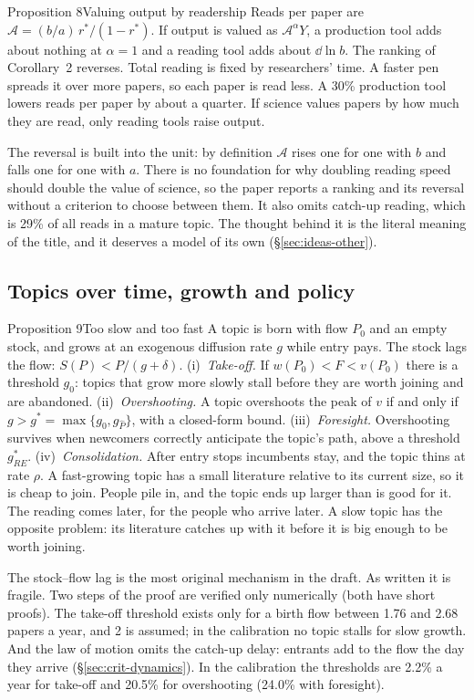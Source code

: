 \begin{resultbox}{Proposition 8}{Valuing output by readership}{\tminor}
Reads per paper are $\mathcal A=(b/a)\,r^*/(1-r^*)$. If output is valued as $\mathcal A^{\alpha}Y$, a production tool adds about nothing at $\alpha=1$ and a reading tool adds about $\dd\ln b$. The ranking of Corollary~2 reverses.
\tcblower
\inwords Total reading is fixed by researchers' time. A faster pen spreads it over more papers, so each paper is read less. A 30\% production tool lowers reads per paper by about a quarter. If science values papers by how much they are read, only reading tools raise output.

\review The reversal is built into the unit: by definition $\mathcal A$ rises one for one with $b$ and falls one for one with $a$. There is no foundation for why doubling reading speed should double the value of science, so the paper reports a ranking and its reversal without a criterion to choose between them. It also omits catch-up reading, which is 29\% of all reads in a mature topic. The thought behind it is the literal meaning of the title, and it deserves a model of its own (\S\ref{sec:ideas-other}).
\end{resultbox}

\subsection{Topics over time, growth and policy}

\begin{resultbox}{Proposition 9}{Too slow and too fast}{\tfragile}
A topic is born with flow $P_0$ and an empty stock, and grows at an exogenous diffusion rate $g$ while entry pays. The stock lags the flow: $S(P)<P/(g+\delta)$.
(i)~\emph{Take-off.} If $w(P_0)<F<v(P_0)$ there is a threshold $g_0$: topics that grow more slowly stall before they are worth joining and are abandoned.
(ii)~\emph{Overshooting.} A topic overshoots the peak of $v$ if and only if $g>g^*=\max\{g_0,g_{\hat P}\}$, with a closed-form bound.
(iii)~\emph{Foresight.} Overshooting survives when newcomers correctly anticipate the topic's path, above a threshold $g^*_{RE}$.
(iv)~\emph{Consolidation.} After entry stops incumbents stay, and the topic thins at rate $\rho$.
\tcblower
\inwords A fast-growing topic has a small literature relative to its current size, so it is cheap to join. People pile in, and the topic ends up larger than is good for it. The reading comes later, for the people who arrive later. A slow topic has the opposite problem: its literature catches up with it before it is big enough to be worth joining.

\review The stock--flow lag is the most original mechanism in the draft. As written it is fragile. Two steps of the proof are verified only numerically (both have short proofs). The take-off threshold exists only for a birth flow between 1.76 and 2.68 papers a year, and 2 is assumed; in the calibration no topic stalls for slow growth. And the law of motion omits the catch-up delay: entrants add to the flow the day they arrive (\S\ref{sec:crit-dynamics}). In the calibration the thresholds are 2.2\% a year for take-off and 20.5\% for overshooting (24.0\% with foresight).
\end{resultbox}

